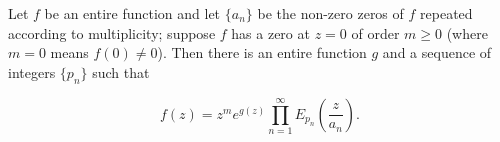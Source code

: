 Let $f$ be an entire function and let $\{a_n\}$ be the non-zero zeros of $f$ repeated according to multiplicity; suppose $f$ has a zero at $z = 0$ of order $m \geq 0$ (where $m = 0$ means $f(0) \neq 0$). Then there is an entire function $g$ and a sequence of integers $\{p_n\}$ such that

$$f(z) = z^m e^{g(z)} \prod_{n=1}^{\infty} E_{p_n}\left(\frac{z}{a_n}\right).$$
